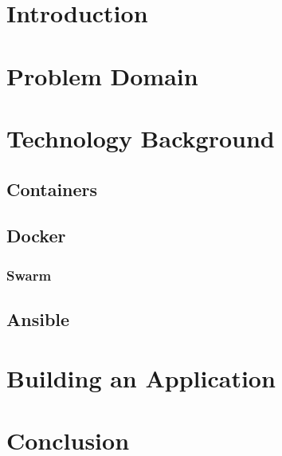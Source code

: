 \documentclass{article}
\author{Stephen Coady}
\begin{document}

\thispagestyle{empty}

\newpage
\tableofcontents
\newpage

\newpage
\section{Introduction}
\label{sec:Introduction}

\newpage
\section{Problem Domain}
\label{sec:Problem}


\newpage
\section{Technology Background}
\label{sec:Background}

\subsection{Containers}
\label{sub:Containers}

\subsection{Docker}
\label{sub:Docker}

\subsubsection{Swarm}
\label{subs:Swarm}

\subsection{Ansible}
\label{sub:Ansible}


\newpage
\section{Building an Application}
\label{sec:Build}

\newpage
\section{Conclusion}
\label{sec:Conclusion}

\newpage

\end{document}
